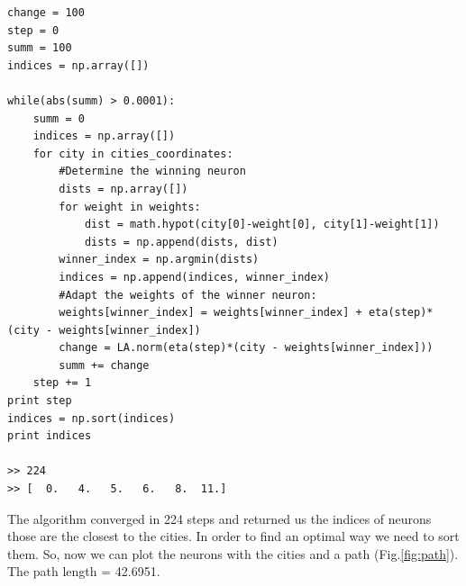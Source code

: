 \documentclass[a4paper, 12pt]{article}
\begin{document}
\lstset{language=Python}
\begin{lstlisting}[frame=single]
change = 100
step = 0
summ = 100
indices = np.array([])

while(abs(summ) > 0.0001):
    summ = 0
    indices = np.array([])
    for city in cities_coordinates:
        #Determine the winning neuron
        dists = np.array([])
        for weight in weights:
            dist = math.hypot(city[0]-weight[0], city[1]-weight[1])
            dists = np.append(dists, dist)
        winner_index = np.argmin(dists)
        indices = np.append(indices, winner_index)
        #Adapt the weights of the winner neuron:
        weights[winner_index] = weights[winner_index] + eta(step)*(city - weights[winner_index])
        change = LA.norm(eta(step)*(city - weights[winner_index]))
        summ += change
    step += 1
print step
indices = np.sort(indices)
print indices

>> 224
>> [  0.   4.   5.   6.   8.  11.]
\end{lstlisting}

The algorithm converged in 224 steps and returned us the indices of neurons those are the closest to the cities. In order to find an optimal way we need to sort them. So, now we can plot the neurons with the cities and a path (Fig.\ref{fig:path}). The path length = 42.6951.
\end{document}
